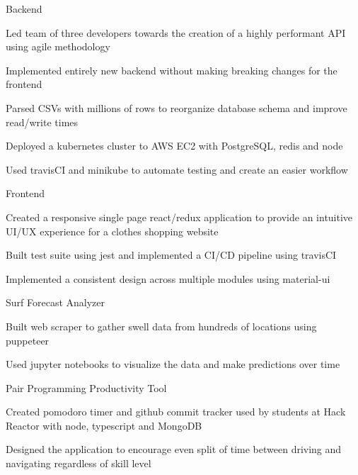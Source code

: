 
\begin{cventries}
  \cventry
    {} %
    {Backend} %
    {} %
    {} %
    {
      \begin{cvitems} %
        \item {Led team of three developers towards the creation of a highly performant API using agile methodology}
        \item {Implemented entirely new backend without making breaking changes for the frontend}
		\item {Parsed CSVs with millions of rows to reorganize database schema and improve read/write times}
		\item {Deployed a kubernetes cluster to AWS EC2 with PostgreSQL, redis and node}
		\item {Used travisCI and minikube to automate testing and create an easier workflow}
      \end{cvitems}
    }
  
  \cventry
    {} %
    {Frontend} %
    {} %
    {} %
    {
      \begin{cvitems} %
		\item {Created a responsive single page react/redux application to provide an intuitive UI/UX experience for a clothes shopping website}
		\item {Built test suite using jest and implemented a CI/CD pipeline using travisCI}
		\item {Implemented a consistent design across multiple modules using material-ui}
      \end{cvitems}
    }

  \cventry
    {} %
    {Surf Forecast Analyzer} %
    {} %
    {} %
    {
      \begin{cvitems} %
      	\item {Built web scraper to gather swell data from hundreds of locations using puppeteer}
		\item {Used jupyter notebooks to visualize the data and make predictions over time}
      \end{cvitems}
    }
    
  \cventry
    {} %
    {Pair Programming Productivity Tool} %
    {} %
    {} %
    {
      \begin{cvitems} %
      	\item {Created pomodoro timer and github commit tracker used by students at Hack Reactor with node, typescript and MongoDB}
      	\item {Designed the application to encourage even split of time between driving and navigating regardless of skill level}
      \end{cvitems}
    }
\end{cventries}